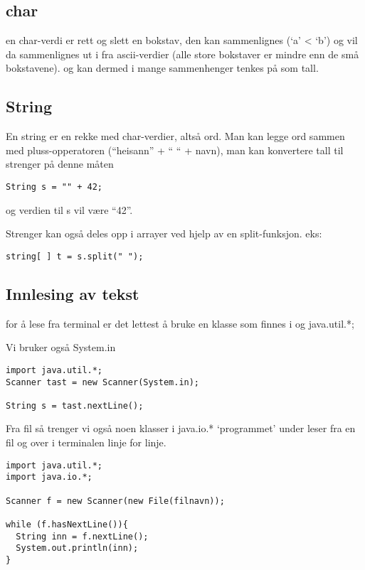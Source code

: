 \documentclass[11pt]{article}
\begin{document}
\subsection{char}
\label{sec-3-1}


   en char-verdi er rett og slett en bokstav, den kan sammenlignes (`a' < `b') 
   og vil da sammenlignes ut
   i fra ascii-verdier (alle store bokstaver er mindre enn de små bokstavene).
   og kan dermed i mange sammenhenger tenkes på som tall.
\subsection{String}
\label{sec-3-2}


   En string er en rekke med char-verdier, altså ord. Man kan legge ord
   sammen med pluss-opperatoren 
   (``heisann'' + `` `` + navn), man kan konvertere tall til strenger på denne måten

\begin{verbatim}
String s = "" + 42;
\end{verbatim}
   og verdien til s vil være ``42''.

   Strenger kan også deles opp i arrayer ved hjelp av en split-funksjon. eks:

\begin{verbatim}
string[ ] t = s.split(" ");
\end{verbatim}
\subsection{Innlesing av tekst}
\label{sec-3-3}

for å lese fra terminal er det lettest å bruke en klasse som
finnes i og java.util.*;

Vi bruker også System.in


\begin{verbatim}
import java.util.*;
Scanner tast = new Scanner(System.in);

String s = tast.nextLine();
\end{verbatim}

Fra fil så trenger vi også noen klasser i java.io.*
`programmet' under leser fra en fil og over i terminalen linje for linje.


\begin{verbatim}
import java.util.*;
import java.io.*;

Scanner f = new Scanner(new File(filnavn));

while (f.hasNextLine()){
  String inn = f.nextLine();
  System.out.println(inn);
}
\end{verbatim}
\end{document}
